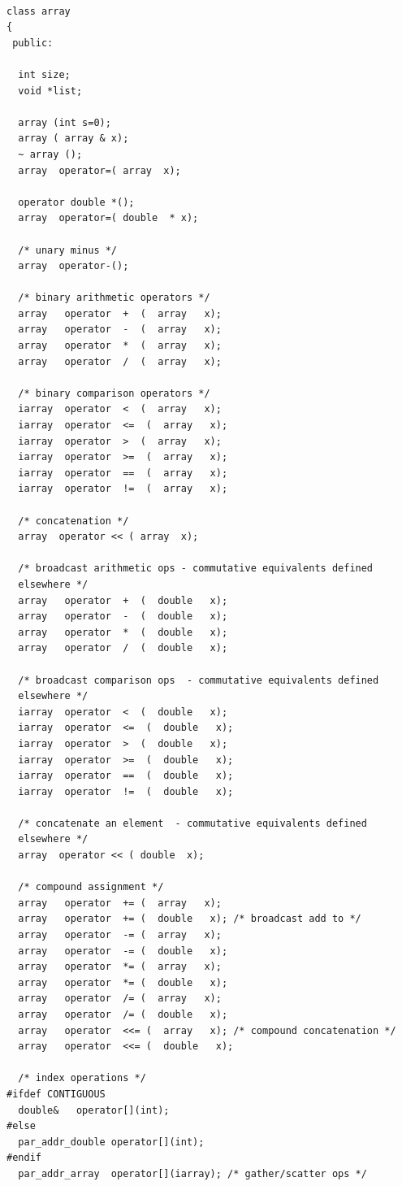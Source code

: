 \begin{verbatim}

class array
{
 public:

  int size; 
  void *list;  

  array (int s=0);
  array ( array & x);
  ~ array ();
  array  operator=( array  x); 

  operator double *();
  array  operator=( double  * x);

  /* unary minus */
  array  operator-();

  /* binary arithmetic operators */
  array   operator  +  (  array   x);
  array   operator  -  (  array   x);
  array   operator  *  (  array   x);
  array   operator  /  (  array   x);

  /* binary comparison operators */
  iarray  operator  <  (  array   x);
  iarray  operator  <=  (  array   x);
  iarray  operator  >  (  array   x);
  iarray  operator  >=  (  array   x);
  iarray  operator  ==  (  array   x);
  iarray  operator  !=  (  array   x);

  /* concatenation */
  array  operator << ( array  x);

  /* broadcast arithmetic ops - commutative equivalents defined
  elsewhere */
  array   operator  +  (  double   x);
  array   operator  -  (  double   x);
  array   operator  *  (  double   x);
  array   operator  /  (  double   x);

  /* broadcast comparison ops  - commutative equivalents defined
  elsewhere */
  iarray  operator  <  (  double   x); 
  iarray  operator  <=  (  double   x);
  iarray  operator  >  (  double   x);
  iarray  operator  >=  (  double   x);
  iarray  operator  ==  (  double   x);
  iarray  operator  !=  (  double   x);

  /* concatenate an element  - commutative equivalents defined
  elsewhere */
  array  operator << ( double  x);

  /* compound assignment */
  array   operator  += (  array   x);
  array   operator  += (  double   x); /* broadcast add to */
  array   operator  -= (  array   x);
  array   operator  -= (  double   x);
  array   operator  *= (  array   x);
  array   operator  *= (  double   x);
  array   operator  /= (  array   x);
  array   operator  /= (  double   x);
  array   operator  <<= (  array   x); /* compound concatenation */ 
  array   operator  <<= (  double   x);

  /* index operations */
#ifdef CONTIGUOUS
  double&   operator[](int);
#else
  par_addr_double operator[](int);
#endif
  par_addr_array  operator[](iarray); /* gather/scatter ops */


\end{verbatim}
